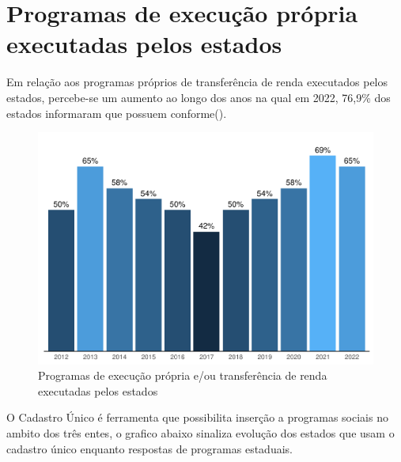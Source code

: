 \documentclass[
  brazilian]{report}
\begin{document}
\hypertarget{programas-de-execuuxe7uxe3o-pruxf3pria-executadas-pelos-estados}{%
\section{Programas de execução própria executadas pelos
estados}\label{programas-de-execuuxe7uxe3o-pruxf3pria-executadas-pelos-estados}}

Em relação aos programas próprios de transferência de renda executados
pelos estados, percebe-se um aumento ao longo dos anos na qual em 2022,
76,9\% dos estados informaram que possuem
conforme().

\begin{figure}
\includegraphics{Censo-SUAS-2022_files/figure-latex/be_uf_renda-1} \caption[Programas de execução própria e/ou transferência de renda executadas pelos estados]{Programas de execução própria e/ou transferência de renda executadas pelos estados}\label{fig:be_uf_renda}
\end{figure}

O Cadastro Único é ferramenta que possibilita inserção a programas
sociais no ambito dos três entes, o grafico abaixo sinaliza evolução dos
estados que usam o cadastro único enquanto respostas de programas
estaduais.
\end{document}
